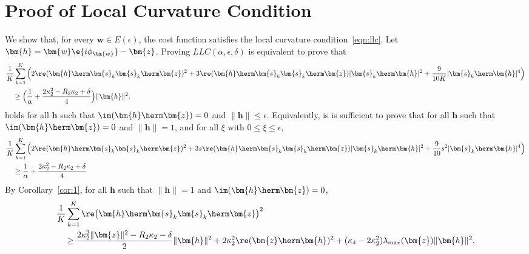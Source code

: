 	
	
	
	
\section{Proof of Local Curvature Condition}\label{appdx:llc}
We show that, for every $\bm{w}\in E(\epsilon)$, the cost function satisfies the local curvature condition~\ref{eqn:llc}. Let $\bm{h}=\bm{w}\e{i\phi_{\bm{w}}}-\bm{z}$. Proving $LLC(\alpha,\epsilon,\delta)$ is equivalent to prove that
\begin{align}
&\frac{1}{K}\sum_{k=1}^K\Big(2\re(\bm{h}\herm\bm{s}_k\bm{s}_k\herm\bm{z})^2+3\re(\bm{h}\herm\bm{s}_k\bm{s}_k\herm\bm{z})|\bm{s}_k\herm\bm{h}|^2+\frac{9}{10K}|\bm{s}_k\herm\bm{h}|^4\Big)\nonumber\\
&\quad \geq \Big( \frac{1}{\alpha}+\frac{2\kappa_2^2-R_2\kappa_2+\delta}{4}\Big)\|\bm{h}\|^2.
\end{align}
holds for all $\bm{h}$ such that $\im(\bm{h}\herm\bm{z})=0$ and $\|\bm{h}\|\leq\epsilon$. Equivalently, is is sufficient to prove that for all $\bm{h}$ such that $\im(\bm{h}\herm\bm{z})=0$ and $\|\bm{h}\|=1$, and for all $\xi$ with $0\leq \xi\leq \epsilon$, 
\begin{align}
&\frac{1}{K}\sum_{k=1}^K\Big(2\re(\bm{h}\herm\bm{s}_k\bm{s}_k\herm\bm{z})^2+3s\re(\bm{h}\herm\bm{s}_k\bm{s}_k\herm\bm{z})|\bm{s}_k\herm\bm{h}|^2+\frac{9}{10}s^2|\bm{s}_k\herm\bm{h}|^4\Big)\nonumber\\
&\quad \geq \frac{1}{\alpha}+\frac{2\kappa_2^2-R_2\kappa_2+\delta}{4}
\end{align}
By Corollary~\ref{cor:1}, for all $\bm{h}$ such that $\|\bm{h}\|=1$ and $\im(\bm{h}\herm\bm{z})=0$,
\begin{align}
&\frac{1}{K}\sum_{k=1}^K\re\big(\bm{h}\herm\bm{s}_k\bm{s}_k\herm\bm{z}\big)^2\nonumber\\
&\quad\geq\frac{2\kappa_2^2\|\bm{z}\|^2-R_2\kappa_2-\delta}{2}\|\bm{h}\|^2+2\kappa_2^2\re(\bm{z}\herm\bm{h})^2+(\kappa_4-2\kappa_2^2)\lambda_{\mathrm{max}}(\bm{z})\|\bm{h}\|^2.
\end{align}
